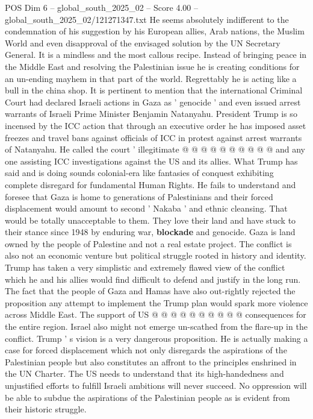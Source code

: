 \begin{textsample}{POS Dim 6 – global\_south\_2025\_02 – Score 4.00 – global\_south\_2025\_02/121271347.txt}
He seems absolutely indifferent to the condemnation of his suggestion by his European allies, Arab nations, the Muslim World and even disapproval of the envisaged solution by the UN Secretary General.
It is a mindless and the most callous recipe.
Instead of bringing peace in the Middle East and resolving the Palestinian issue he is creating conditions for an un-ending mayhem in that part of the world.
Regrettably he is acting like a bull in the china shop.
It is pertinent to mention that the international Criminal Court had declared Israeli actions in Gaza as ' genocide ' and even issued arrest warrants of Israeli Prime Minister Benjamin Natanyahu.
President Trump is so incensed by the ICC action that through an executive order he has imposed asset freezes and travel bans against officials of ICC in protest against arrest warrants of Natanyahu.
He called the court ' illegitimate @ @ @ @ @ @ @ @ @ @ and any one assisting ICC investigations against the US and its allies.
What Trump has said and is doing sounds colonial-era like fantasies of conquest exhibiting complete disregard for fundamental Human Rights.
He fails to understand and foresee that Gaza is home to generations of Palestinians and their forced displacement would amount to second ' Nakaba ' and ethnic cleansing.
That would be totally unacceptable to them.
They love their land and have stuck to their stance since 1948 by enduring war, \textbf{blockade} and genocide.
Gaza is land owned by the people of Palestine and not a real estate project.
The conflict is also not an economic venture but political struggle rooted in history and identity.
Trump has taken a very simplistic and extremely flawed view of the conflict which he and his allies would find difficult to defend and justify in the long run.
The fact that the people of Gaza and Hamas have also out-rightly rejected the proposition any attempt to implement the Trump plan would spark more violence across Middle East.
The support of US @ @ @ @ @ @ @ @ @ @ consequences for the entire region.
Israel also might not emerge un-scathed from the flare-up in the conflict.
Trump ' s vision is a very dangerous proposition.
He is actually making a case for forced displacement which not only disregards the aspirations of the Palestinian people but also constitutes an affront to the principles enshrined in the UN Charter.
The US needs to understand that its high-handedness and unjustified efforts to fulfill Israeli ambitions will never succeed.
No oppression will be able to subdue the aspirations of the Palestinian people as is evident from their historic struggle.

\end{textsample}
